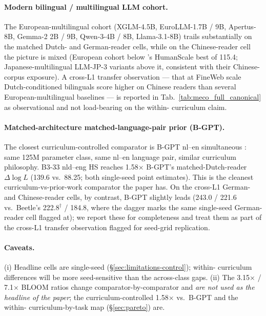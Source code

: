 \paragraph{Modern bilingual / multilingual LLM cohort.} The European-multilingual cohort (XGLM-4.5B, EuroLLM-1.7B / 9B, Apertus-8B, Gemma-2 2B / 9B, Qwen-3-4B / 8B, Llama-3.1-8B) trails \beetle{} substantially on the matched Dutch- and German-reader cells, while on the Chinese-reader cell the picture is mixed (European cohort below \beetle{}'s HumanScale best of 115.4; Japanese-multilingual LLM-JP-3 variants above it, consistent with their Chinese-corpus exposure). A cross-L1 transfer observation --- that at FineWeb scale Dutch-conditioned \beetle{} bilinguals score higher on Chinese readers than several European-multilingual baselines --- is reported in Tab.~\ref{tab:meco_full_canonical} as observational and not load-bearing on the within-\beetle{} curriculum claim.

\paragraph{Matched-architecture matched-language-pair prior (B-GPT).} The closest curriculum-controlled comparator is B-GPT nl--en simultaneous \citep{arnett-etal-2025-acquisition}: same 125M parameter class, same nl--en language pair, similar curriculum philosophy. \beetle{} B3-33 nld--eng HS reaches 1.58$\times$ B-GPT's matched-Dutch-reader $\Delta\log L$ (139.6 vs.\ 88.25; both single-seed point estimates). This is the cleanest curriculum-vs-prior-work comparator the paper has. On the cross-L1 German- and Chinese-reader cells, by contrast, B-GPT slightly leads (243.0 / 221.6 vs.\ Beetle's 222.8$^{\dagger}$ / 184.8, where the dagger marks the same single-seed German-reader cell flagged at); we report these for completeness and treat them as part of the cross-L1 transfer observation flagged for seed-grid replication.

\paragraph{Caveats.} (i) Headline cells are single-seed (\S\ref{sec:limitations-control}); within-\beetle{} curriculum differences will be more seed-sensitive than the across-class gaps. (ii) The 3.15$\times$ / 7.1$\times$ BLOOM ratios change comparator-by-comparator and \emph{are not used as the headline of the paper}; the curriculum-controlled 1.58$\times$ vs.\ B-GPT and the within-\beetle{} curriculum-by-task map (\S\ref{sec:pareto}) are.